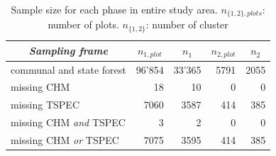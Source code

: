 \begin{table}[H]
	\begin{center}
		\caption{Sample size for each phase in entire study area. $n_{\{1,2\},plots}$: number of plots. $n_{\{1,2\}}$: number of cluster}
		\vspace{0.2cm}
		\label{tab:ssize}
		{\small %
			\begin{tabular}{l|r|r|r|r}
				\hline
				\multicolumn{1}{c|}{\textit{Sampling frame}} & \multicolumn{1}{c|}{\textbf{$n_{1,plot}$}}  & \multicolumn{1}{c|}{\textbf{$n_1$}}  & \multicolumn{1}{c|}{\textbf{$n_{2,plot}$}}  & \multicolumn{1}{c}{\textbf{$n_2$}} \\ %
				\hline \hline
				communal and state forest & 96'854 & 33'365 & 5791 & 2055\\ %
				\hspace{5mm} \footnotesize missing CHM & \footnotesize 18 & \footnotesize 10 & \footnotesize 0 & \footnotesize 0\\ %
				\hspace{5mm} \footnotesize missing TSPEC & \footnotesize 7060  & \footnotesize 3587 & \footnotesize 414 & \footnotesize 385\\ %
				\hspace{5mm} \footnotesize missing CHM \textit{and} TSPEC & \footnotesize 3 & \footnotesize 2 & \footnotesize 0 & \footnotesize 0\\ %
				\hspace{5mm} \footnotesize missing CHM \textit{or} TSPEC & \footnotesize 7075 & \footnotesize 3595 & \footnotesize 414 & \footnotesize 385\\ %
				\hline \hline
			\end{tabular}
		} %
	\end{center}
\end{table}


